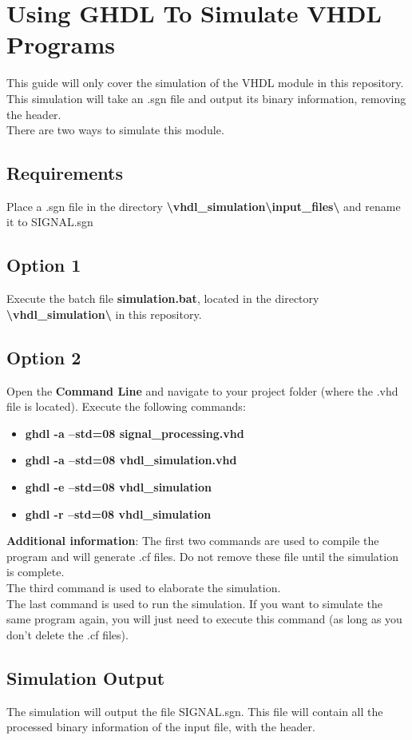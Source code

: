 \section{Using GHDL To Simulate VHDL Programs}
This guide will only cover the simulation of the VHDL module in this repository.\\
This simulation will take an .sgn file and output its binary information, removing the header.\\
There are two ways to simulate this module.
\subsection{Requirements}
Place a .sgn file in the directory \textbf{\textbackslash{}vhdl\_simulation\textbackslash{}input\_files\textbackslash{}} and rename it to SIGNAL.sgn

\subsection{Option 1}
Execute the batch file \textbf{simulation.bat}, located in the directory \textbf{\textbackslash{}vhdl\_simulation\textbackslash{}} in this repository.

\subsection{Option 2}
Open the \textbf{Command Line} and navigate to your project folder (where the .vhd file is located).
Execute the following commands:
\begin{itemize}
  \item[] \textbf{ghdl -a --std=08 signal\_processing.vhd}
  \item[] \textbf{ghdl -a --std=08 vhdl\_simulation.vhd}
  \item[] \textbf{ghdl -e --std=08 vhdl\_simulation}
  \item[] \textbf{ghdl -r --std=08 vhdl\_simulation}
\end{itemize}
\textbf{Additional information}: The first two commands are used to compile the program and will generate .cf files. Do not remove these file until the simulation is complete.\\
The third command is used to elaborate the simulation.\\
The last command is used to run the simulation. If you want to simulate the same program again, you will just need to execute this command (as long as you don't delete the .cf files).

\subsection{Simulation Output}
The simulation will output the file SIGNAL.sgn. This file will contain all the processed binary information of the input file, with the header. 